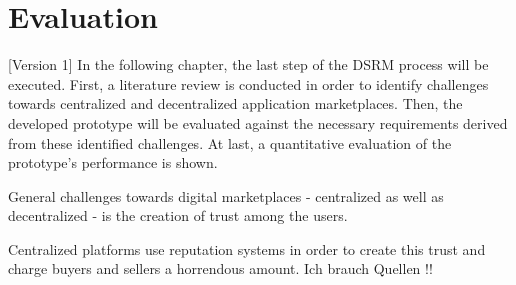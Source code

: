 \chapter{Evaluation}
\label{cha:evaluation}

[Version 1]
In the following chapter, the last step of the DSRM process will be executed.  First, a literature review is conducted in order to identify challenges towards centralized and decentralized application marketplaces. Then, the developed prototype will be evaluated against the necessary requirements derived from these identified challenges. At last, a quantitative evaluation of the prototype's performance is shown. 

General challenges towards digital marketplaces - centralized as well as decentralized - is the creation of trust among the users. 

Centralized platforms use reputation systems in order to create this trust and charge buyers and sellers a horrendous amount. Ich brauch Quellen !! 
 